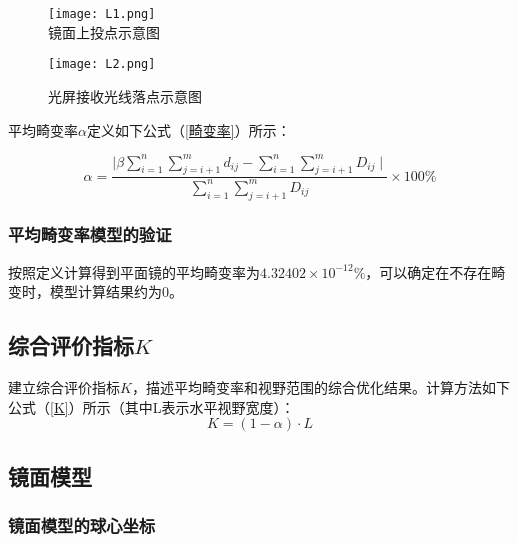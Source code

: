 \documentclass[withoutpreface,bwprint]{cumcmthesis} %
\begin{document}
\begin{figure}[!htbp]  
\begin{minipage}[t]{0.5\textwidth}
\centering  
\texttt{[image: L1.png]} \\
\caption{镜面上投点示意图} \label{L1}
\end{minipage}
\hspace{1ex}
\begin{minipage}[t]{0.5\textwidth}  
\centering  
\texttt{[image: L2.png]}\\
\caption{光屏接收光线落点示意图}  \label{L2}
\end{minipage}  
\end{figure} 


\par 平均畸变率$\alpha$定义如下公式（\ref{畸变率}）所示：


\begin{equation}
\label{畸变率}
	\alpha = \frac{\mid \beta \sum\limits_{i = 1}^{n}\sum\limits_{j = i + 1}^{m} d_{ij} - \sum\limits_{i = 1}^{n}\sum\limits_{j = i + 1}^{m} D_{ij} \mid}{\sum\limits_{i = 1}^{n}\sum\limits_{j = i + 1}^{m} D_{ij}} \times 100 \%
\end{equation}


\subsubsection{平均畸变率模型的验证}

\par 按照定义计算得到平面镜的平均畸变率为$4.32402\times 10^{-12}\%$，可以确定在不存在畸变时，模型计算结果约为0。


\subsection{综合评价指标$K$}
\par 建立综合评价指标$K$，描述平均畸变率和视野范围的综合优化结果。计算方法如下公式（\ref{K}）所示（其中L表示水平视野宽度）：
\begin{equation}
\label{K}
	K = (1 - \alpha) \cdot L
\end{equation}

\subsection{镜面模型}
\subsubsection{镜面模型的球心坐标}
\end{document}
